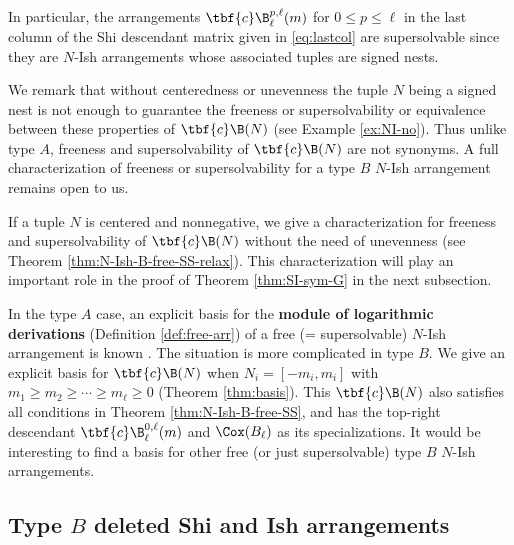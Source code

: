  In particular, the arrangements $\tbf{c}\B^{p,\ell}_\ell(m)$ for $0 \le p \le \ell$ in the last column of the Shi descendant matrix given in \eqref{eq:lastcol} are  supersolvable since they are $N$-Ish arrangements whose associated tuples are signed nests. 
 
 We remark that without centeredness or unevenness the tuple $N$ being a signed nest is not enough to guarantee the freeness or supersolvability or equivalence between these properties of $\tbf{c}\B(N)$ (see Example \ref{ex:NI-no}). 
 Thus unlike type $A$, freeness and supersolvability of $\tbf{c}\B(N)$ are not synonyms. 
 A full characterization of freeness or supersolvability for a type $B$ $N$-Ish arrangement remains open to us.
 
If a tuple $N$ is centered and nonnegative, we give a characterization for freeness and supersolvability of $\tbf{c}\B(N)$ without the need of unevenness (see Theorem \ref{thm:N-Ish-B-free-SS-relax}). 
This characterization will play an important role in the proof of Theorem \ref{thm:SI-sym-G} in the next subsection.

 In the type $A$ case, an explicit basis for the \textbf{module of logarithmic derivations} (Definition \ref{def:free-arr}) of a free (= supersolvable) $N$-Ish arrangement is known \cite[Theorem 1.4]{AST17}. 
 The situation is more complicated in type $B$.
 We give an explicit basis for $\tbf{c}\B(N)$ when $N_i=[-m_i,m_i]$ with $ m_1 \ge m_2 \ge \cdots \ge m_\ell \ge 0$ (Theorem \ref{thm:basis}). 
This $\tbf{c}\B(N)$ also satisfies all conditions in Theorem \ref{thm:N-Ish-B-free-SS}, and has the top-right descendant $ \tbf{c}\B^{0,\ell}_\ell(m)$ and $\Cox(B_\ell)$ as its specializations. 
It would be interesting to find a basis for other free (or just supersolvable) type $B$ $N$-Ish arrangements.

\subsection{Type \texorpdfstring{$B$}{B} deleted Shi and Ish arrangements}
\label{subsec:Bdelete}

